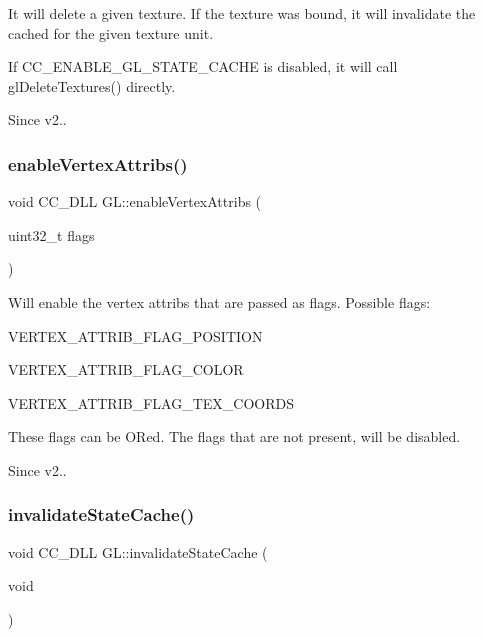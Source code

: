 It will delete a given texture. If the texture was bound, it will invalidate the cached for the given texture unit.

If C\+C\+\_\+\+E\+N\+A\+B\+L\+E\+\_\+\+G\+L\+\_\+\+S\+T\+A\+T\+E\+\_\+\+C\+A\+C\+HE is disabled, it will call gl\+Delete\+Textures() directly. \begin{DoxySince}{Since}
v2.. 
\end{DoxySince}
\mbox{\label{group__renderer_ga84757e12b5ee56e6e57ab3f4785c8c16}} 
\subsubsection{\texorpdfstring{enable\+Vertex\+Attribs()}{enableVertexAttribs()}}
{\footnotesize\ttfamily void C\+C\+\_\+\+D\+LL G\+L\+::enable\+Vertex\+Attribs (\begin{DoxyParamCaption}\item[{uint32\+\_\+t}]{flags }\end{DoxyParamCaption})}

Will enable the vertex attribs that are passed as flags. Possible flags\+:


\begin{DoxyItemize}
\item V\+E\+R\+T\+E\+X\+\_\+\+A\+T\+T\+R\+I\+B\+\_\+\+F\+L\+A\+G\+\_\+\+P\+O\+S\+I\+T\+I\+ON
\item V\+E\+R\+T\+E\+X\+\_\+\+A\+T\+T\+R\+I\+B\+\_\+\+F\+L\+A\+G\+\_\+\+C\+O\+L\+OR
\item V\+E\+R\+T\+E\+X\+\_\+\+A\+T\+T\+R\+I\+B\+\_\+\+F\+L\+A\+G\+\_\+\+T\+E\+X\+\_\+\+C\+O\+O\+R\+DS
\end{DoxyItemize}

These flags can be O\+Red. The flags that are not present, will be disabled.

\begin{DoxySince}{Since}
v2.. 
\end{DoxySince}
\mbox{\label{group__renderer_gacde276633720dd2a8d95ae216caea11a}} 
\subsubsection{\texorpdfstring{invalidate\+State\+Cache()}{invalidateStateCache()}}
{\footnotesize\ttfamily void C\+C\+\_\+\+D\+LL G\+L\+::invalidate\+State\+Cache (\begin{DoxyParamCaption}\item[{void}]{ }\end{DoxyParamCaption})}

